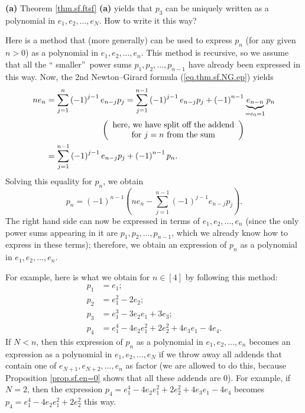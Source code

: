 \begin{example}
\textbf{(a)} Theorem \ref{thm.sf.ftsf} \textbf{(a)} yields that $p_{3}$ can be
uniquely written as a polynomial in $e_{1},e_{2},\ldots,e_{N}$. How to write
it this way?

Here is a method that (more generally) can be used to express $p_{n}$ (for any
given $n>0$) as a polynomial in $e_{1},e_{2},\ldots,e_{n}$. This method is
recursive, so we assume that all the \textquotedblleft
smaller\textquotedblright\ power sums $p_{1},p_{2},\ldots,p_{n-1}$ have
already been expressed in this way. Now, the 2nd Newton--Girard formula
(\ref{eq.thm.sf.NG.ep}) yields
\begin{align*}
ne_{n}  &  =\sum\limits_{j=1}^{n}\left(  -1\right)  ^{j-1}e_{n-j}p_{j}%
=\sum\limits_{j=1}^{n-1}\left(  -1\right)  ^{j-1}e_{n-j}p_{j}+\left(
-1\right)  ^{n-1}\underbrace{e_{n-n}}_{=e_{0}=1}p_{n}\\
&  \ \ \ \ \ \ \ \ \ \ \ \ \ \ \ \ \ \ \ \ \left(
\begin{array}
[c]{c}%
\text{here, we have split off the addend}\\
\text{for }j=n\text{ from the sum}%
\end{array}
\right) \\
&  =\sum\limits_{j=1}^{n-1}\left(  -1\right)  ^{j-1}e_{n-j}p_{j}+\left(
-1\right)  ^{n-1}p_{n}.
\end{align*}
Solving this equality for $p_{n}$, we obtain
\[
p_{n}=\left(  -1\right)  ^{n-1}\left(  ne_{n}-\sum\limits_{j=1}^{n-1}\left(
-1\right)  ^{j-1}e_{n-j}p_{j}\right)  .
\]
The right hand side can now be expressed in terms of $e_{1},e_{2},\ldots
,e_{n}$ (since the only power sums appearing in it are $p_{1},p_{2}%
,\ldots,p_{n-1}$, which we already know how to express in these terms);
therefore, we obtain an expression of $p_{n}$ as a polynomial in $e_{1}%
,e_{2},\ldots,e_{n}$.

For example, here is what we obtain for $n\in\left[  4\right]  $ by following
this method:
\begin{align*}
p_{1}  &  =e_{1};\\
p_{2}  &  =e_{1}^{2}-2e_{2};\\
p_{3}  &  =e_{1}^{3}-3e_{2}e_{1}+3e_{3};\\
p_{4}  &  =e_{1}^{4}-4e_{2}e_{1}^{2}+2e_{2}^{2}+4e_{3}e_{1}-4e_{4}.
\end{align*}
If $N<n$, then this expression of $p_{n}$ as a polynomial in $e_{1}%
,e_{2},\ldots,e_{n}$ becomes an expression as a polynomial in $e_{1}%
,e_{2},\ldots,e_{N}$ if we throw away all addends that contain one of
$e_{N+1},e_{N+2},\ldots,e_{n}$ as factor (we are allowed to do this, because
Proposition \ref{prop.sf.en=0} shows that all these addends are $0$). For
example, if $N=2$, then the expression $p_{4}=e_{1}^{4}-4e_{2}e_{1}^{2}%
+2e_{2}^{2}+4e_{3}e_{1}-4e_{4}$ becomes $p_{4}=e_{1}^{4}-4e_{2}e_{1}%
^{2}+2e_{2}^{2}$ this way. \medskip


\end{example}
